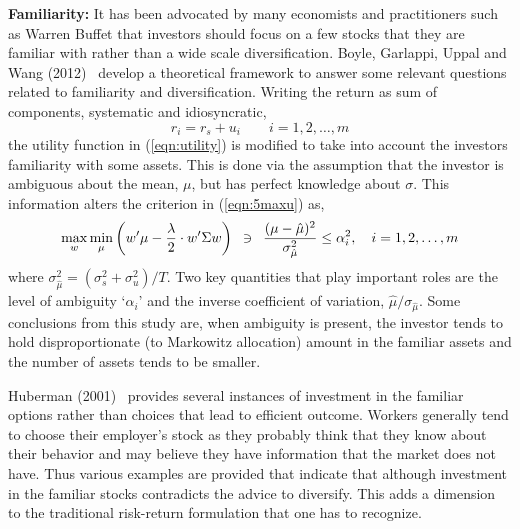 \noindent \textbf{Familiarity:} It has been advocated by many economists and practitioners such as Warren Buffet that investors should focus on a few stocks that they are familiar with rather than a wide scale diversification. Boyle, Garlappi, Uppal and Wang (2012)~\cite{bguwang} develop a theoretical framework to answer some relevant questions related to familiarity and diversification. Writing the return as sum of components, systematic and idiosyncratic,
	\begin{equation}\label{eqn:rirsui}
	r_i = r_s + u_i \quad\quad i=1,2,\ldots,m
	\end{equation}
the utility function in (\ref{eqn:utility}) is modified to take into account the investors familiarity with some assets. This is done via the assumption that the investor is ambiguous about the mean, $\mu$, but has perfect knowledge about $\sigma$. This information alters the criterion in (\ref{eqn:5maxu}) as,
	\begin{equation}\label{eqn:maxminwmu}
	\max_w \min_\mu \left(w'\mu - \frac{\lambda}{2} \cdot w' \Sigma w \right)\enskip \ni \enskip\dfrac{(\mu-\hat{\mu})^2}{\sigma_{\hat{\mu}}^2} \leq \alpha_i^2, \quad i=1,2,\ldots,m
	\end{equation}
where $\sigma_{\hat{\mu}}^2= (\sigma_s^2+\sigma_u^2)/T$. Two key quantities that play important roles are the level of ambiguity `$\alpha_i$' and the inverse coefficient of variation, $\hat{\mu}/\sigma_{\hat{\mu}}$. Some conclusions from this study are, when ambiguity is present, the investor tends to hold disproportionate (to Markowitz allocation) amount in the familiar assets and the number of assets tends to be smaller.


Huberman (2001)~\cite{Hub} provides several instances of investment in the familiar options rather than choices that lead to efficient outcome. Workers generally tend to choose their employer's stock as they probably think that they know about their behavior and may believe they have information that the market does not have. Thus various examples are provided that indicate that although investment in the familiar stocks contradicts the advice to diversify. This adds a dimension to the traditional risk-return formulation that one has to recognize. \\


